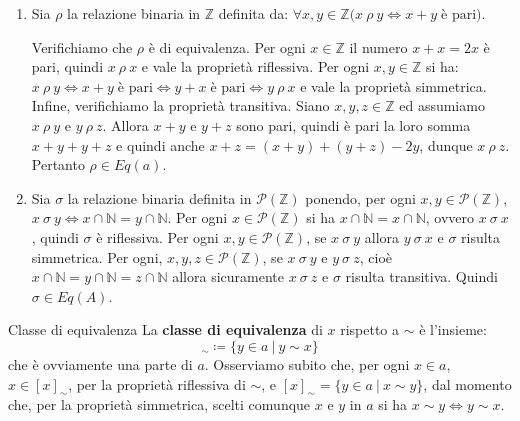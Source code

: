 \begin{example}
\begin{enumerate}
	\item Sia $\rho$ la relazione binaria in $\mathbb{Z}$ definita da: $\forall x,y \in \mathbb{Z} \bigl(x \ \rho \ y \Longleftrightarrow x+y \; \mbox{è pari}\bigr)$.
	
	Verifichiamo che $\rho$ è di equivalenza. Per ogni $x \in \mathbb{Z}$ il numero $x+x = 2x$ è pari, quindi $x \ \rho \ x$ e vale la proprietà riflessiva. Per ogni $x,y \in \mathbb{Z}$ si ha: $x \ \rho \ y \Leftrightarrow x+y \; \mbox{è pari} \Leftrightarrow y+x \; \mbox{è pari} \Leftrightarrow y \ \rho \ x$ e vale la proprietà simmetrica. Infine, verifichiamo la proprietà transitiva. Siano $x,y,z \in \mathbb{Z}$ ed assumiamo $x \ \rho \ y$ e $y \ \rho \ z$. Allora $x+y$ e $y+z$ sono pari, quindi è pari la loro somma $x+y+y+z$ e quindi anche $x+z = (x+y)+(y+z)-2y$, dunque $x \ \rho \ z$. Pertanto $\rho \in Eq(a)$.

	\item Sia $\sigma$ la relazione binaria definita in $\mathcal{P}(\mathbb{Z})$ ponendo, per ogni $x,y \in \mathcal{P}(\mathbb{Z})$, $x \ \sigma \ y \iff x \cap \mathbb{N} = y \cap \mathbb{N}$. Per ogni $x \in \mathcal{P}(\mathbb{Z})$ si ha $x \cap \mathbb{N} = x \cap \mathbb{N}$, ovvero $x \ \sigma \ x$, quindi $\sigma$ è riflessiva. Per ogni $x,y \in \mathcal{P}(\mathbb{Z})$, se $x \ \sigma \ y$ allora $y \ \sigma \ x$ e $\sigma$ risulta simmetrica. Per ogni, $x,y,z \in \mathcal{P}(\mathbb{Z})$, se $x \ \sigma \ y$ e $y \ \sigma \ z$, cioè $x \cap \mathbb{N} = y \cap \mathbb{N} = z \cap \mathbb{N}$ allora sicuramente $x \ \sigma \ z$ e $\sigma$ risulta transitiva. Quindi $\sigma \in Eq(A)$.
\end{enumerate}
\end{example}

\begin{defbox}{Classe di equivalenza}
	La \textbf{classe di equivalenza} di $x$ rispetto a $\sim$ è l'insieme:
	\begin{equation}
		[x]_{\sim} \coloneqq \{y \in a \ | \ y \sim x\}
	\end{equation}
	che è ovviamente una parte di $a$. Osserviamo subito che, per ogni $x \in a$, $x \in [x]_{\sim}$, per la proprietà riflessiva di $\sim$, e $[x]_{\sim}=\{y \in a \ | \ x \sim y\}$, dal momento che, per la proprietà simmetrica, scelti comunque $x$ e $y$ in $a$ si ha $x \sim y \Leftrightarrow y \sim x$.
\end{defbox}

